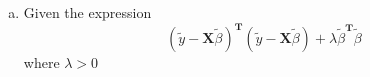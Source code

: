 \documentclass[12pt]{article}
\newcommand{\ytilde}{\tilde{y}}
\newcommand{\X}{\mathbf{X}}
\newcommand{\btilde}{\tilde{\beta}}
\newcommand{\xtx}{\X^{\T}\X}
\newcommand{\I}{\mathbf{I}}
\newcommand{\T}{\mathbf{T}}
\begin{document}
\begin{enumerate}[1.]
\begin{enumerate}[a)]
\begin{proof}
\begin{align*}
                        &= ad + a\lambda + d\lambda + \lambda^2 - bc \\
                        &= ad + \lambda(a + d) + \lambda^2 - bc
                    \end{align*}
                    Given that $\text{det}(\xtx) = 0 \Rightarrow ad - bc = 0 \Leftrightarrow ad = bc$.
                    \begin{align*}
                        \text{det}(\xtx + \lambda \I) &= bc + \lambda(a + d) + \lambda^2 - bc \\
                        &= \lambda(a + d) + \lambda^2
                    \end{align*}
                    \begin{align*} 
                        \because \lambda \neq 0 &\Rightarrow \lambda^2 > 0 \\
                        \because a, d \geq 0 &\Rightarrow a + d > 0 \\
                        &\Rightarrow \lambda(a + d) + \lambda^2 > 0
                    \end{align*}
                
                    $\therefore$ We have shown that $\text{det}(\xtx + \lambda \I) \neq 0$ when $\lambda \neq 0$.
                \end{proof}

                \item Given the expression 
                \[(\ytilde - \X \btilde)^\T(\ytilde - \X \btilde) + \lambda \btilde^\T \btilde\]
                where $\lambda > 0$


\end{enumerate}
\end{enumerate}
\end{document}
